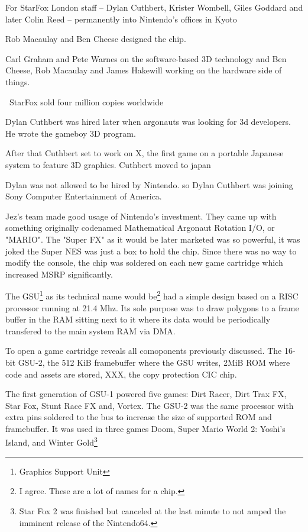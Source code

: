 For StarFox London staff – Dylan Cuthbert, Krister Wombell, Giles Goddard and later Colin Reed – permanently into Nintendo’s offices in Kyoto\\ 
\par
Rob Macaulay and Ben Cheese designed the chip.\\
\par
Carl Graham and Pete Warnes on the software-based 3D technology and Ben Cheese, Rob Macaulay and James Hakewill working on the hardware side of things.\\
\par 
StarFox sold four million copies worldwide\\
\par
 Dylan Cuthbert was hired later when argonauts was looking for 3d developers. He wrote the gameboy 3D program.\\
 \par
 After that Cuthbert set to work on X, the first game on a portable Japanese system to feature 3D graphics. Cuthbert moved to japan\\
 \par
Dylan was not allowed to be hired by Nintendo. so Dylan Cuthbert was joining Sony Computer Entertainment of America.
\par
Jez's team made good usage of Nintendo's investment. They came up with something originally codenamed Mathematical Argonaut Rotation I/O, or "MARIO". The "Super FX" as it would be later marketed was so powerful, it was joked the Super NES was just a box to hold the chip. Since there was no way to modify the console, the chip was soldered on each new game cartridge which increased MSRP significantly.\\

\pagebreak




\par
The GSU\footnote{Graphics Support Unit} as its technical name would be\footnote{I agree. These are a lot of names for a chip.} had a simple design based on a RISC processor running at 21.4 Mhz. Its sole purpose was to draw polygons to a frame buffer in the RAM sitting next to it where its data would be periodically transfered to the main system RAM via DMA.\\
\par
To open a \doom game cartridge reveals all comoponents previously discussed.  The 16-bit GSU-2, the 512 KiB framebuffer where the GSU writes,  2MiB ROM where \doom code and assets are stored,  XXX,  the copy protection CIC chip.\\
\par
The first generation of GSU-1 powered five games: Dirt Racer, Dirt Trax FX, Star Fox, Stunt Race FX and, Vortex. The GSU-2 was the same processor with extra pins soldered to the bus to increase the size of supported ROM and framebuffer. It was used in three games Doom, Super Mario World 2: Yoshi's Island, and Winter Gold\footnote{Star Fox 2 was finished but canceled at the last minute to not amped the imminent release of the Nintendo64.}



